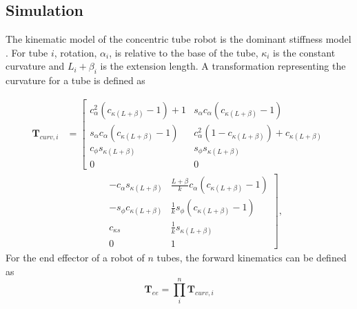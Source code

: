 \subsection{Simulation}
The kinematic model of the concentric tube robot is the dominant stiffness model \cite{Dupont2010}. For tube $i$, rotation, $\alpha_i$, is relative to the base of the tube, $\kappa_i$ is the constant curvature and $L_i + \beta_i$ is the extension length. A transformation representing the curvature for a tube is defined as

\begin{equation}\label{curvature-transformation}
\begin{aligned}
\textbf{T}_{curv,i} &=
\left[\begin{matrix}
  c^2_\alpha (c_{\kappa  \left(L+\beta\right)} - 1) + 1 & s_\alpha c_\alpha (c_{\kappa  \left(L+\beta\right)} - 1) \\
  s_\alpha c_\alpha (c_{\kappa  \left(L+\beta\right)} - 1) & c^2_\alpha (1 - c_{\kappa  \left(L+\beta\right)}) + c_{\kappa  \left(L+\beta\right)} \\
  c_{\phi} s_{\kappa  \left(L+\beta\right)} & s_{\phi} s_{\kappa  \left(L+\beta\right)} \\
  0 & 0
\end{matrix}\right.\\
&\qquad\qquad
\left.\begin{matrix}
  - c_\alpha s_{\kappa  \left(L+\beta\right)}  & \frac{L+\beta}{k} c_\alpha (c_{\kappa \left(L+\beta\right)} - 1) \\
  - s_\phi c_{\kappa \left(L+\beta\right)} & \frac{1}{k} s_\phi (c_{\kappa  \left(L+\beta\right)} - 1) \\
  c_{\kappa s} & \frac{1}{k} s_{\kappa  \left(L+\beta\right)} \\
  0 & 1
\end{matrix}\right],
\end{aligned}
\end{equation}
For the end effector of a robot of $n$ tubes, the forward kinematics can be defined as
\begin{equation}
\textbf{T}_{ee} = \prod^{n}_{i} \textbf{T}_{curv,i}
\end{equation}

